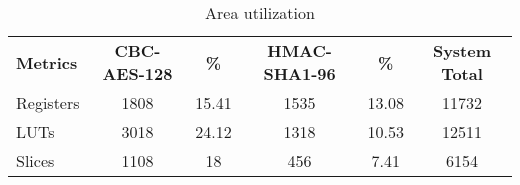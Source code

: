\begin{table}[]
\centering
\begin{tabular}{l|cc|cc|c|}
\hline
\multirow{2}{*}{\textbf{Metrics}} &
\multirow{2}{*}{\textbf{CBC-AES-128}} & 
\multirow{2}{*}{\textbf{\%}} & 
\multirow{2}{*}{\textbf{HMAC-SHA1-96}} & 
\multirow{2}{*}{\textbf{\%}} & 
\multirow{2}{*}{\textbf{System Total}} \\
    &   &   &    &   & \\
\hline
Registers    & 1808    & 15.41   & 1535     & 13.08   & 11732 \\
LUTs   & 3018    & 24.12   & 1318     & 10.53   & 12511 \\
Slices    & 1108    & 18   & 456   & 7.41    & 6154    \\
\hline
\end{tabular}
\caption{Area utilization}
\label{table:7.4}
\end{table}
